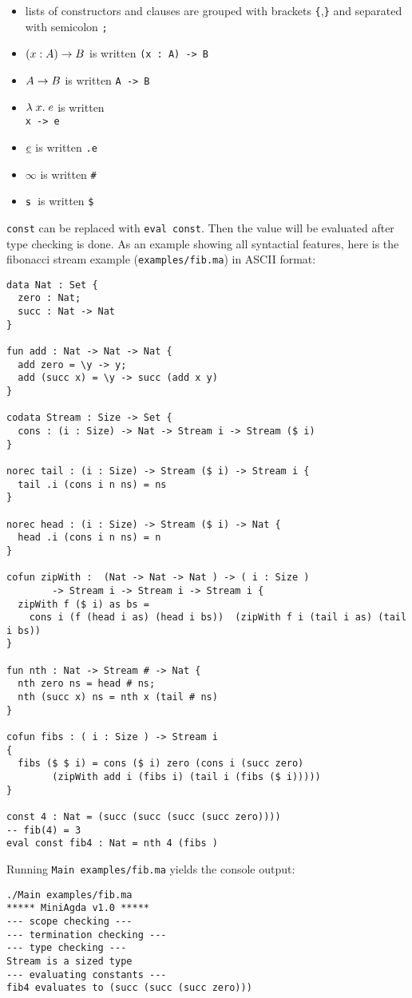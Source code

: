 \begin{itemize}
\item
lists of constructors and clauses are grouped with brackets \texttt{\{},\texttt{\}} and separated with semicolon \texttt{;}
\item
$( x : A ) \rightarrow{B}$ is written \texttt{(x : A) -> B }
\item
$A \rightarrow B$ is written \texttt{A -> B}
\item
$ \lambda\; x .\;e$ is written \texttt{\\ x -> e }
\item
$ \underline{e}$ is written \texttt {.e} 
\item
$ \infty$ is written \texttt{\#} 
\item
$\mathsf{s}\;$ is written \texttt{\$}
\end{itemize}
\texttt{const} can be replaced with {\texttt {eval const}}. Then the value will be evaluated after type checking is done.
As an example showing all syntactial features, here is the fibonacci stream example (\texttt{examples/fib.ma}) in ASCII format:
\begin{verbatim}
data Nat : Set {
  zero : Nat;
  succ : Nat -> Nat 
}

fun add : Nat -> Nat -> Nat {
  add zero = \y -> y;
  add (succ x) = \y -> succ (add x y)
}

codata Stream : Size -> Set {
  cons : (i : Size) -> Nat -> Stream i -> Stream ($ i)
}
 
norec tail : (i : Size) -> Stream ($ i) -> Stream i {
  tail .i (cons i n ns) = ns
}

norec head : (i : Size) -> Stream ($ i) -> Nat {
  head .i (cons i n ns) = n
}

cofun zipWith :  (Nat -> Nat -> Nat ) -> ( i : Size ) 
		-> Stream i -> Stream i -> Stream i {
  zipWith f ($ i) as bs = 
	cons i (f (head i as) (head i bs))  (zipWith f i (tail i as) (tail i bs)) 
}

fun nth : Nat -> Stream # -> Nat {
  nth zero ns = head # ns;
  nth (succ x) ns = nth x (tail # ns) 
}

cofun fibs : ( i : Size ) -> Stream i
{
  fibs ($ $ i) = cons ($ i) zero (cons i (succ zero)
	 	(zipWith add i (fibs i) (tail i (fibs ($ i)))))
}

const 4 : Nat = (succ (succ (succ (succ zero))))
-- fib(4) = 3 
eval const fib4 : Nat = nth 4 (fibs ) 

\end{verbatim}
Running \texttt{Main examples/fib.ma} yields the console output:
\begin{verbatim}
./Main examples/fib.ma
***** MiniAgda v1.0 *****
--- scope checking ---
--- termination checking ---
--- type checking ---
Stream is a sized type 
--- evaluating constants ---
fib4 evaluates to (succ (succ (succ zero)))

\end{verbatim}

